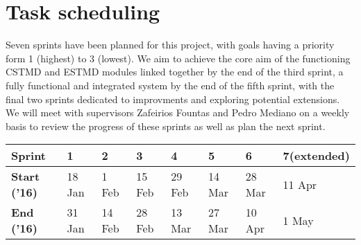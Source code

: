 \section{Task scheduling} \label{taskscheduling}
\par  Seven sprints have been planned for this project, with goals having a priority form 1 (highest) to 3 (lowest). We aim to achieve the core aim of the functioning CSTMD and ESTMD modules linked together by the end of the third sprint, a fully functional and integrated system by the end of the fifth sprint, with the final two sprints dedicated to improvments and exploring potential extensions. We will meet with supervisors Zafeirios Fountas and Pedro Mediano on a weekly basis to review the progress of these sprints as well as plan the next sprint.

\begin{center}
    \begin{tabular}{l p{1.4cm} p{1.4cm} p{1.4cm} p{1.5cm} p{1.4cm} p{1.4cm} p{1.8cm}}
    \textbf{Sprint} & 1 & 2 & 3 & 4 & 5 & 6 & 7(extended) \\
    \hline
    \textbf{Start ('16)}
    &18 Jan & 1 Feb & 15 Feb & 29 Feb & 14 Mar & 28 Mar & 11 Apr \\
    \textbf{End ('16)}
    &31 Jan & 14 Feb & 28 Feb & 13 Mar & 27 Mar & 10 Apr & 1 May\\
    \end{tabular}
\end{center}

